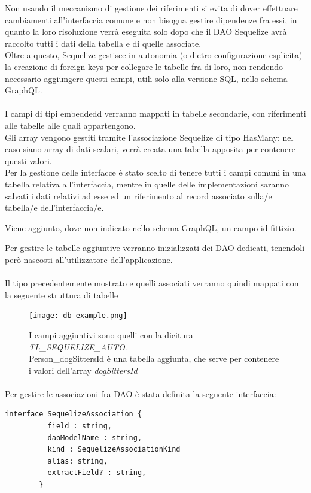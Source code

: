 \documentclass[a4paper, 12pt]{report}
\begin{document}
      Non usando il meccanismo di gestione dei riferimenti si evita di dover effettuare cambiamenti all'interfaccia comune e non bisogna gestire dipendenze fra essi, in quanto la loro risoluzione verrà eseguita solo dopo che il DAO Sequelize avrà raccolto tutti i dati della tabella e di quelle associate.\\
      Oltre a questo, Sequelize gestisce in autonomia (o dietro configurazione esplicita) la creazione di foreign keys per collegare le tabelle fra di loro, non rendendo necessario aggiungere questi campi, utili solo alla versione SQL, nello schema GraphQL.
      \paragraph*{}
      I campi di tipi embeddedd verranno mappati in tabelle secondarie, con riferimenti alle tabelle alle quali appartengono.\\
      Gli array vengono gestiti tramite l'associazione Sequelize di tipo HasMany: nel caso siano array di dati scalari, verrà creata una tabella apposita per contenere questi valori. \\
      Per la gestione delle interfacce è stato scelto di tenere tutti i campi comuni in una tabella relativa all'interfaccia, mentre in quelle delle implementazioni saranno salvati i dati relativi ad esse ed un riferimento al record associato sulla/e tabella/e dell'interfaccia/e.

      Viene aggiunto, dove non indicato nello schema GraphQL, un campo id fittizio.

      Per gestire le tabelle aggiuntive verranno inizializzati dei DAO dedicati, tenendoli però nascosti all'utilizzatore dell'applicazione.

      \paragraph*{}
      Il tipo precedentemente mostrato e quelli associati verranno quindi mappati con la seguente struttura di tabelle
      \begin{figure}[H]
        \texttt{[image: db-example.png]}
        \caption{I campi aggiuntivi sono quelli con la dicitura \emph{TL_SEQUELIZE_AUTO}.\\Person_dogSittersId è una tabella aggiunta, che serve per contenere i valori dell'array \emph{dogSittersId}}
      \end{figure}
      \paragraph*{}
      Per gestire le associazioni fra DAO è stata definita la seguente interfaccia:
      \begin{Verbatim}[samepage=true]
        interface SequelizeAssociation {
          field : string,
          daoModelName : string,
          kind : SequelizeAssociationKind
          alias: string,
          extractField? : string,
        }
      \end{Verbatim}
\end{document}

